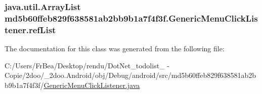 \hypertarget{classmd5b60ffeb829f638581ab2bb9b1a7f4f3f_1_1_generic_menu_click_listener_909ed47c921c4011184b52ac08dcc46e}{
\subsubsection[{refList}]{\setlength{\rightskip}{0pt plus 5cm}java.util.ArrayList {\bf md5b60ffeb829f638581ab2bb9b1a7f4f3f.GenericMenuClickListener.refList}}}
\label{classmd5b60ffeb829f638581ab2bb9b1a7f4f3f_1_1_generic_menu_click_listener_909ed47c921c4011184b52ac08dcc46e}




The documentation for this class was generated from the following file:\begin{CompactItemize}
\item 
C:/Users/FrBea/Desktop/rendu/DotNet\_\-todolist\_ - Copie/2doo/\_\-2doo.Android/obj/Debug/android/src/md5b60ffeb829f638581ab2bb9b1a7f4f3f/\hyperlink{_generic_menu_click_listener_8java}{GenericMenuClickListener.java}\end{CompactItemize}
